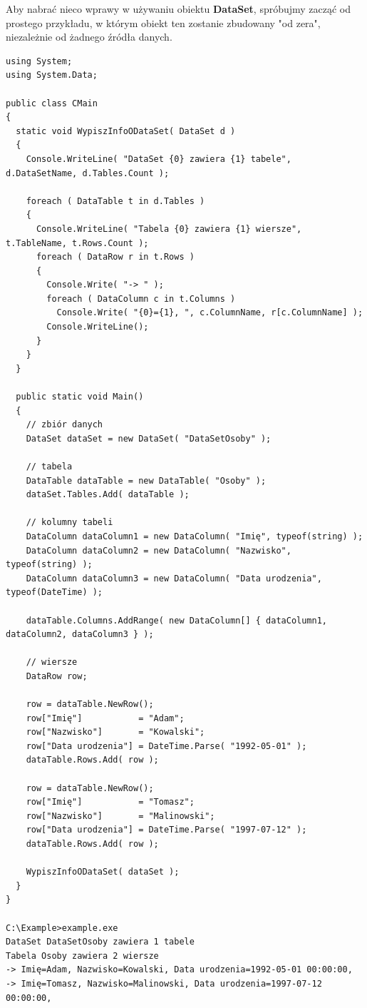Aby nabrać nieco wprawy w używaniu obiektu {\bf DataSet}, spróbujmy zacząć od prostego przykładu, w
którym obiekt ten zostanie zbudowany "od zera", niezależnie od żadnego źródła danych. 

\begin{scriptsize}
\begin{verbatim}
using System;
using System.Data;

public class CMain
{
  static void WypiszInfoODataSet( DataSet d )
  {
    Console.WriteLine( "DataSet {0} zawiera {1} tabele", d.DataSetName, d.Tables.Count );
 
    foreach ( DataTable t in d.Tables )
    {
      Console.WriteLine( "Tabela {0} zawiera {1} wiersze", t.TableName, t.Rows.Count );
      foreach ( DataRow r in t.Rows )
      {
        Console.Write( "-> " );
        foreach ( DataColumn c in t.Columns )
          Console.Write( "{0}={1}, ", c.ColumnName, r[c.ColumnName] );
        Console.WriteLine();        
      }
    }
  }

  public static void Main()
  {
    // zbiór danych
    DataSet dataSet = new DataSet( "DataSetOsoby" );

    // tabela
    DataTable dataTable = new DataTable( "Osoby" );
    dataSet.Tables.Add( dataTable );

    // kolumny tabeli
    DataColumn dataColumn1 = new DataColumn( "Imię", typeof(string) );
    DataColumn dataColumn2 = new DataColumn( "Nazwisko", typeof(string) );
    DataColumn dataColumn3 = new DataColumn( "Data urodzenia", typeof(DateTime) );

    dataTable.Columns.AddRange( new DataColumn[] { dataColumn1, dataColumn2, dataColumn3 } );

    // wiersze
    DataRow row;

    row = dataTable.NewRow();
    row["Imię"]           = "Adam";
    row["Nazwisko"]       = "Kowalski";
    row["Data urodzenia"] = DateTime.Parse( "1992-05-01" );
    dataTable.Rows.Add( row ); 

    row = dataTable.NewRow();
    row["Imię"]           = "Tomasz";
    row["Nazwisko"]       = "Malinowski";
    row["Data urodzenia"] = DateTime.Parse( "1997-07-12" );
    dataTable.Rows.Add( row ); 
    
    WypiszInfoODataSet( dataSet );
  }
}

C:\Example>example.exe
DataSet DataSetOsoby zawiera 1 tabele
Tabela Osoby zawiera 2 wiersze
-> Imię=Adam, Nazwisko=Kowalski, Data urodzenia=1992-05-01 00:00:00,
-> Imię=Tomasz, Nazwisko=Malinowski, Data urodzenia=1997-07-12 00:00:00,
\end{verbatim}
\end{scriptsize}

